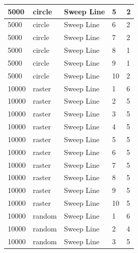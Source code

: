 \documentclass[12pt]{article}
\begin{document}
\begin{longtable}{|l|l|l|l|l|}
5000         & circle            & Sweep Line & 5          & 2                             \\ \hline
5000         & circle            & Sweep Line & 6          & 2                             \\ \hline
5000         & circle            & Sweep Line & 7          & 2                             \\ \hline
5000         & circle            & Sweep Line & 8          & 1                             \\ \hline
5000         & circle            & Sweep Line & 9          & 1                             \\ \hline
5000         & circle            & Sweep Line & 10         & 2                             \\ \hline
10000        & raster            & Sweep Line & 1          & 6                             \\ \hline
10000        & raster            & Sweep Line & 2          & 5                             \\ \hline
10000        & raster            & Sweep Line & 3          & 5                             \\ \hline
10000        & raster            & Sweep Line & 4          & 5                             \\ \hline
10000        & raster            & Sweep Line & 5          & 5                             \\ \hline
10000        & raster            & Sweep Line & 6          & 5                             \\ \hline
10000        & raster            & Sweep Line & 7          & 5                             \\ \hline
10000        & raster            & Sweep Line & 8          & 5                             \\ \hline
10000        & raster            & Sweep Line & 9          & 5                             \\ \hline
10000        & raster            & Sweep Line & 10         & 5                             \\ \hline
10000        & random            & Sweep Line & 1          & 6                             \\ \hline
10000        & random            & Sweep Line & 2          & 4                             \\ \hline
10000        & random            & Sweep Line & 3          & 5                             \\ \hline

\end{longtable}
\end{document}
